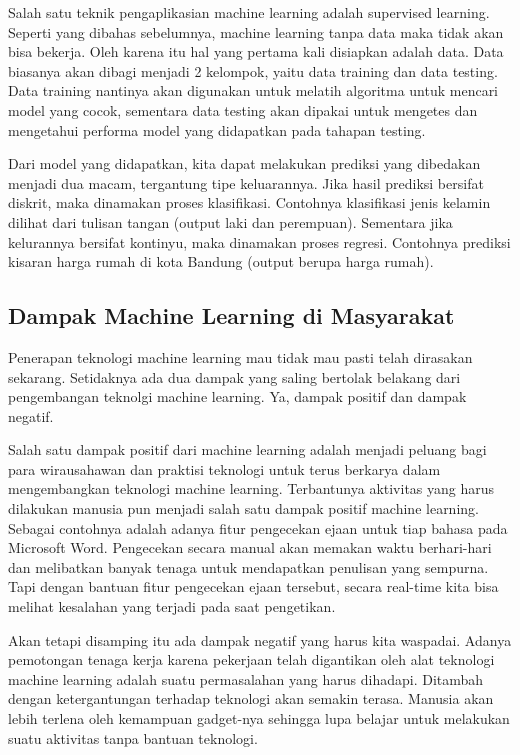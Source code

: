 Salah satu teknik pengaplikasian machine learning adalah supervised learning. Seperti yang dibahas sebelumnya, machine learning tanpa data maka tidak akan bisa bekerja. Oleh karena itu hal yang pertama kali disiapkan adalah data. Data biasanya akan dibagi menjadi 2 kelompok, yaitu data training dan data testing. Data training nantinya akan digunakan untuk melatih algoritma untuk mencari model yang cocok, sementara data testing akan dipakai untuk mengetes dan mengetahui performa model yang didapatkan pada tahapan testing.
\par Dari model yang didapatkan, kita dapat melakukan prediksi yang dibedakan menjadi dua macam, tergantung tipe keluarannya. Jika hasil prediksi bersifat diskrit, maka dinamakan proses klasifikasi. Contohnya klasifikasi jenis kelamin dilihat dari tulisan tangan (output laki dan perempuan). Sementara jika kelurannya bersifat kontinyu, maka dinamakan proses regresi. Contohnya prediksi kisaran harga rumah di kota Bandung (output berupa harga rumah).

\subsection{Dampak Machine Learning di Masyarakat}
Penerapan teknologi machine learning mau tidak mau pasti telah dirasakan sekarang. Setidaknya ada dua dampak yang saling bertolak belakang dari pengembangan teknolgi machine learning. Ya, dampak positif dan dampak negatif.
\par Salah satu dampak positif dari machine learning adalah menjadi peluang bagi para wirausahawan dan praktisi teknologi untuk terus berkarya dalam mengembangkan teknologi machine learning. Terbantunya aktivitas yang harus dilakukan manusia pun menjadi salah satu dampak positif machine learning. Sebagai contohnya adalah adanya fitur pengecekan ejaan untuk tiap bahasa pada Microsoft Word. Pengecekan secara manual akan memakan waktu berhari-hari dan melibatkan banyak tenaga untuk mendapatkan penulisan yang sempurna. Tapi dengan bantuan fitur pengecekan ejaan tersebut, secara real-time kita bisa melihat kesalahan yang terjadi pada saat pengetikan.
\par Akan tetapi disamping itu ada dampak negatif yang harus kita waspadai. Adanya pemotongan tenaga kerja karena pekerjaan telah digantikan oleh alat teknologi machine learning adalah suatu permasalahan yang harus dihadapi. Ditambah dengan ketergantungan terhadap teknologi akan semakin terasa. Manusia akan lebih terlena oleh kemampuan gadget-nya sehingga lupa belajar untuk melakukan suatu aktivitas tanpa bantuan teknologi.

